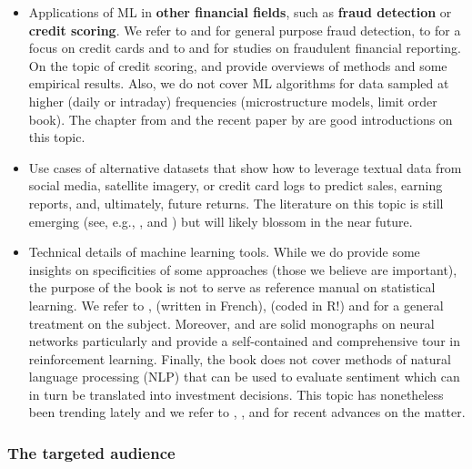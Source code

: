 \begin{itemize}
\item Applications of ML in \textbf{other financial fields}, such as \textbf{fraud detection} or \textbf{credit scoring}. We refer to \citep{ngai2011application} and \citep{baesens2015fraud} for general purpose fraud detection,
to \citep{bhattacharyya2011data} for a focus on credit cards and to \citep{ravisankar2011detection}
and \citep{abbasi2012metafraud} for studies on fraudulent financial reporting. On the topic of credit scoring,
\citep{wang2011comparative} and \citep{brown2012experimental} provide overviews of methods and some empirical results.
Also, we do not cover ML algorithms for data sampled at higher (daily or intraday) frequencies (microstructure models, limit order book).
The chapter from \citep{kearns2013machine} and the recent paper by \citep{sirignano2019universal} are good introductions on this topic.
\item Use cases of alternative datasets that show how to leverage textual data from social media, satellite imagery, or credit card logs to predict sales, earning reports, and, ultimately, future returns.
The literature on this topic is still emerging (see, e.g., \citep{blank2019using},
\citep{jha2019implementing} and \citep{ke2019predicting}) but will likely blossom in the near future.
\item Technical details of machine learning tools. While we do provide some insights on specificities of some approaches
(those we believe are important), the purpose of the book is not to serve as reference manual on statistical learning.
We refer to \citep{hastie2009elements}, \citep{cornuejols2018apprentissage} (written in French),
\citep{james2013introduction} (coded in R!) and \citep{mohri2018foundations} for a general treatment on the subject.
Moreover, \citep{du2013neural} and \citep{goodfellow2016deep} are solid monographs on neural networks particularly
and \citep{sutton2018reinforcement} provide a self-contained and comprehensive tour in reinforcement learning.
Finally, the book does not cover methods of natural language processing (NLP) that can be used to evaluate sentiment
which can in turn be translated into investment decisions. This topic has nonetheless been trending lately
and we refer to \citep{loughran2016textual}, \citep{cong2019analyzing}, \citep{cong2019textual} and \citep{gentzkow2019text} for recent advances on the matter.
\end{itemize}

\subsubsection{The targeted audience}

